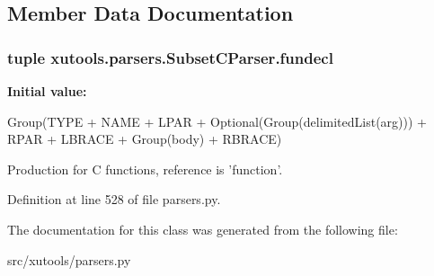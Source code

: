 \subsection{Member Data Documentation}
\hypertarget{classxutools_1_1parsers_1_1_subset_c_parser_a4224655841f4780679e6d2eca53e57bf}{
\subsubsection[{fundecl}]{\setlength{\rightskip}{0pt plus 5cm}tuple xutools.\-parsers.\-Subset\-C\-Parser.\-fundecl\hspace{0.3cm}{\ttfamily [static]}}}\label{classxutools_1_1parsers_1_1_subset_c_parser_a4224655841f4780679e6d2eca53e57bf}
{\bfseries Initial value\-:}
\begin{DoxyCode}
Group(TYPE + NAME + LPAR + Optional(Group(delimitedList(arg))) + RPAR +
                         LBRACE + Group(body) + RBRACE)
\end{DoxyCode}


Production for C functions, reference is 'function'. 



Definition at line 528 of file parsers.\-py.



The documentation for this class was generated from the following file\-:\begin{DoxyCompactItemize}
\item 
src/xutools/parsers.\-py\end{DoxyCompactItemize}
